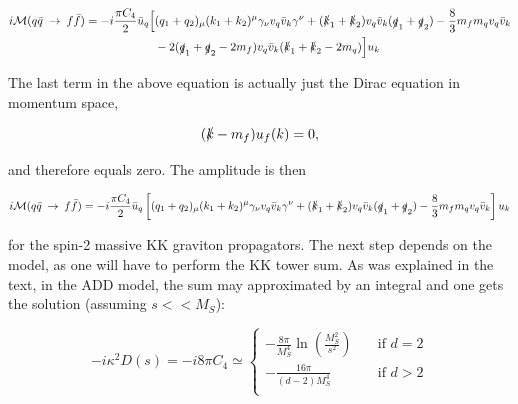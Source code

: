 \documentclass[11pt,a4paper]{article}
\begin{document}
\begin{align}
	\begin{split}
	i\mathcal{M}(q\bar{q}\:\rightarrow\:f\bar{f}) = -i\frac{\pi C_4}{2}\bar{u}_q\Big[&(q_1 + q_2)_ \mu(k_1+k_2)^\mu \gamma_\nu v_q\bar{v}_k\gamma^\nu + (\slashed k_1 + \slashed k_2)v_q\bar{v}_k(\slashed q_1 + \slashed q_2) - \frac{8}{3}m_fm_qv_q\bar{v}_k\\
	&-2(\slashed q_1 + \slashed q_2 - 2m_f)v_q\bar{v}_k(\slashed k_1 + \slashed k_2 - 2m_q)\Big]u_k
	\end{split}
\end{align}

The last term in the above equation is actually just the Dirac equation in momentum space,

\begin{equation}
	(\slashed k - m_f)u_f(k) = 0,
\end{equation}

and therefore equals zero. The amplitude is then

\begin{equation}
	i\mathcal{M}(q\bar{q}\:\rightarrow\:f\bar{f}) = -i\frac{\pi C_4}{2}\bar{u}_q\left[(q_1 + q_2)_ \mu(k_1+k_2)^\mu \gamma_\nu v_q\bar{v}_k\gamma^\nu + (\slashed k_1 + \slashed k_2)v_q\bar{v}_k(\slashed q_1 + \slashed q_2) - \frac{8}{3}m_fm_qv_q\bar{v}_k\right]u_k
\end{equation}

for the spin-2 massive KK graviton propagators. The next step depends on the model, as one will have to perform the KK tower sum. As was explained in the text, in the ADD model, the sum may approximated by an integral and one gets the solution (assuming $s<<M_S$):

\begin{equation}
	-i\kappa^2D(s) = -i8\pi C_4\simeq
	\begin{cases}
	-\frac{8\pi}{M_S^4}\ln\left(\frac{M_S^2}{s^2}\right)       & \quad \text{if } d=2\\
	-\frac{16\pi}{(d-2)M_S^4}  & \quad \text{if } d>2\\
	\end{cases}
\end{equation}
\end{document}

